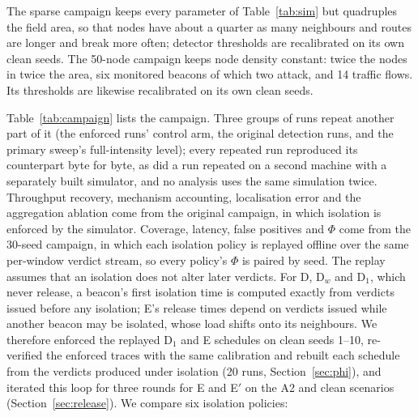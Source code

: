 \documentclass[pdflatex,sn-mathphys-num]{sn-jnl}%
\theoremstyle{thmstyleone}%
\theoremstyle{thmstyletwo}%
\theoremstyle{thmstylethree}%
\begin{document}
The sparse campaign keeps every parameter of Table~\ref{tab:sim} but
quadruples the field area, so that nodes have about a quarter as many
neighbours and routes are longer and break more often; detector thresholds
are recalibrated on its own clean seeds. The 50-node campaign keeps node
density constant: twice the nodes in twice the area, six monitored beacons of
which two attack, and 14 traffic flows. Its thresholds are likewise
recalibrated on its own clean seeds.

Table~\ref{tab:campaign} lists the campaign. Three groups of runs repeat
another part of it (the enforced runs' control arm, the original detection
runs, and the primary sweep's full-intensity level); every repeated run
reproduced its counterpart byte for byte, as did a run repeated on a second
machine with a separately built simulator, and no analysis uses the same
simulation twice. Throughput recovery, mechanism accounting, localisation
error and the aggregation ablation come from the original campaign, in which
isolation is enforced by the simulator. Coverage, latency, false positives and
$\Phi$ come from the 30-seed campaign, in which each isolation policy is
replayed offline over the same per-window verdict stream, so every policy's
$\Phi$ is paired by seed. The replay assumes that an isolation does not alter
later verdicts. For D, D$_w$ and D$_1$, which never release, a beacon's first
isolation time is computed exactly from verdicts issued before any isolation;
E's release times depend on verdicts issued while another beacon may be
isolated, whose load shifts onto its neighbours. We therefore enforced the
replayed D$_1$ and E schedules on clean seeds 1--10, re-verified the enforced
traces with the same calibration and rebuilt each schedule from the verdicts
produced under isolation (20 runs, Section~\ref{sec:phi}), and iterated this
loop for three rounds for E and E$'$ on the A2 and clean scenarios
(Section~\ref{sec:release}). We compare six isolation policies:
\end{document}
